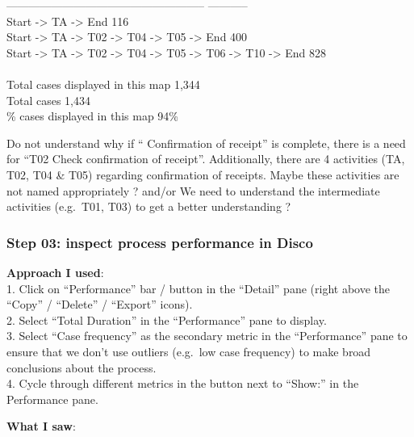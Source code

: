 \documentclass[]{article}
\begin{document}
----------------------------------------------------- \textbar{}
-----------\\ Start -\textgreater{} TA -\textgreater{} End \textbar{}
116\\ Start -\textgreater{} TA -\textgreater{} T02 -\textgreater{} T04
-\textgreater{} T05 -\textgreater{} End \textbar{} 400\\Start
-\textgreater{} TA -\textgreater{} T02 -\textgreater{} T04
-\textgreater{} T05 -\textgreater{} T06 -\textgreater{} T10
-\textgreater{} End \textbar{} 828\\ \textbar{}\\ Total cases displayed
in this map \textbar{} 1,344\\ Total cases \textbar{} 1,434\\ \% cases
displayed in this map \textbar{} 94\%

Do not understand why if `` Confirmation of receipt'' is complete, there
is a need for ``T02 Check confirmation of receipt''. Additionally, there
are 4 activities (TA, T02, T04 \& T05) regarding confirmation of
receipts. Maybe these activities are not named appropriately ? and/or We
need to understand the intermediate activities (e.g.~T01, T03) to get a
better understanding ?

\subsubsection{Step 03: inspect process performance in
Disco}\label{step-03-inspect-process-performance-in-disco}

\textbf{Approach I used}:\\1. Click on ``Performance'' bar / button in
the ``Detail'' pane (right above the ``Copy'' / ``Delete'' / ``Export''
icons).\\2. Select ``Total Duration'' in the ``Performance'' pane to
display.\\3. Select ``Case frequency'' as the secondary metric in the
``Performance'' pane to ensure that we don't use outliers (e.g.~low case
frequency) to make broad conclusions about the process.\\4. Cycle
through different metrics in the button next to ``Show:'' in the
Performance pane.

\textbf{What I saw}:
\end{document}

